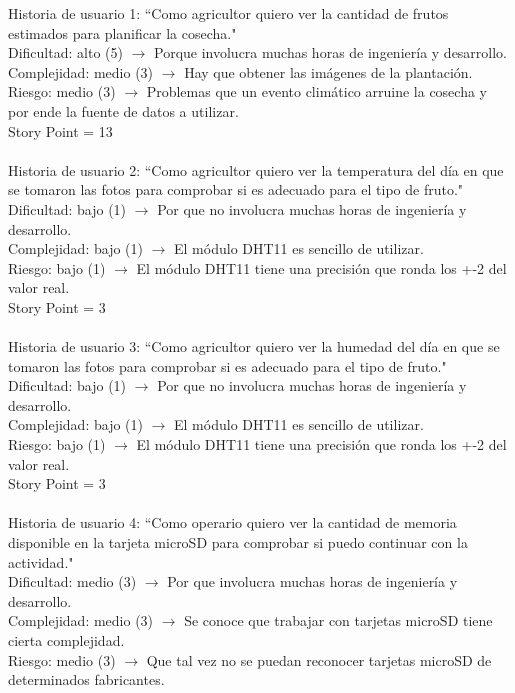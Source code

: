 \documentclass[
11pt, %
]{charter}
\begin{document}
Historia de usuario 1: “Como agricultor quiero ver la cantidad de frutos estimados para planificar la cosecha."
\\
Dificultad: alto (5) $\rightarrow$ Porque involucra muchas horas de ingeniería y desarrollo.
\\
Complejidad: medio (3) $\rightarrow$ Hay que obtener las imágenes de la plantación.
\\
Riesgo: medio (3) $\rightarrow$ Problemas que un evento climático arruine la cosecha y por ende la fuente de datos a utilizar.
\\
Story Point = 13
\\
\\
Historia de usuario 2: “Como agricultor quiero ver la temperatura del día en que se tomaron las fotos para comprobar si es adecuado para el tipo de fruto."
\\
Dificultad: bajo (1) $\rightarrow$ Por que no involucra muchas horas de ingeniería y desarrollo.
\\
Complejidad: bajo (1) $\rightarrow$ El módulo DHT11 es sencillo de utilizar.
\\
Riesgo: bajo (1) $\rightarrow$ El módulo DHT11 tiene una precisión que ronda los +-2 del valor real.
\\
Story Point = 3
\\
\\
Historia de usuario 3: “Como agricultor quiero ver la humedad del día en que se tomaron las fotos para comprobar si es adecuado para el tipo de fruto."
\\
Dificultad: bajo (1) $\rightarrow$ Por que no involucra muchas horas de ingeniería y desarrollo.
\\
Complejidad: bajo (1) $\rightarrow$ El módulo DHT11 es sencillo de utilizar.
\\
Riesgo: bajo (1) $\rightarrow$ El módulo DHT11 tiene una precisión que ronda los +-2 del valor real.
\\
Story Point = 3
\\
\\
Historia de usuario 4: “Como operario quiero ver la cantidad de memoria disponible en la tarjeta microSD para comprobar si puedo continuar con la actividad."
\\
Dificultad: medio (3) $\rightarrow$ Por que involucra muchas horas de ingeniería y desarrollo.
\\
Complejidad: medio (3) $\rightarrow$ Se conoce que trabajar con tarjetas microSD tiene cierta complejidad.
\\
Riesgo: medio (3) $\rightarrow$ Que tal vez no se puedan reconocer tarjetas microSD de determinados fabricantes.
\end{document}
